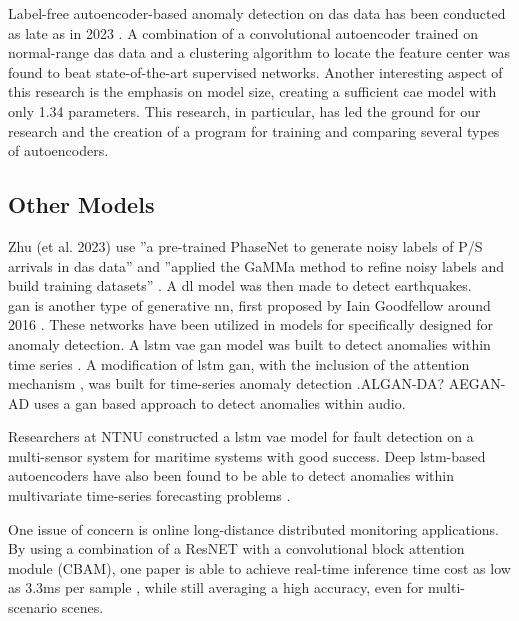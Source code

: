 Label-free autoencoder-based anomaly detection on \acrshort{das} data has been conducted as late as in 2023 \cite{xie2023label}. A combination of a convolutional autoencoder trained on normal-range \acrshort{das} data and a clustering algorithm to locate the feature center was found to beat state-of-the-art supervised networks. Another interesting aspect of this research is the emphasis on model size, creating a sufficient \acrshort{cae} model with only \qty{1.34}{\si{\kilo}} parameters. This research, in particular, has led the ground for our research and the creation of a program for training and comparing several types of autoencoders. \\





\subsection{Other Models}

Zhu (et al. 2023) use ''a pre-trained PhaseNet to generate noisy labels of P/S arrivals in \acrshort{das} data'' and ''applied the GaMMa method to refine noisy labels and build training datasets'' \cite{zhu2023seismic}. A \acrshort{dl} model was then made to detect earthquakes. \\


\acrshort{gan} is another type of generative nn, first proposed by Iain Goodfellow around 2016 \cite{goodfellow2016nips}. These networks have been utilized in models for specifically designed for anomaly detection. A \acrshort{lstm} \acrshort{vae} \acrshort{gan} model was built to detect anomalies within time series \cite{s20133738}. A modification of \acrshort{lstm} \acrshort{gan}, with the inclusion of the attention mechanism \cite{vaswani2017attention}, was built for time-series anomaly detection \cite{bashar2023algan}.ALGAN-DA?
AEGAN-AD \cite{jiang2023unsupervised} uses a \acrshort{gan} based approach to detect anomalies within audio.

Researchers at NTNU constructed a \acrshort{lstm} \acrshort{vae} model for fault detection on a multi-sensor system for maritime systems \cite{9514856} with good success. Deep \acrshort{lstm}-based autoencoders have also been found to be able to detect anomalies within multivariate time-series forecasting problems \cite{alaaDeepLstm2019}.

One issue of concern is online long-distance distributed monitoring applications. By using a combination of a ResNET with a convolutional block attention module (CBAM), one paper is able to achieve real-time inference time cost as low as 3.3ms per sample \cite{photonics9100677}, while still averaging a high accuracy, even for multi-scenario scenes. 


